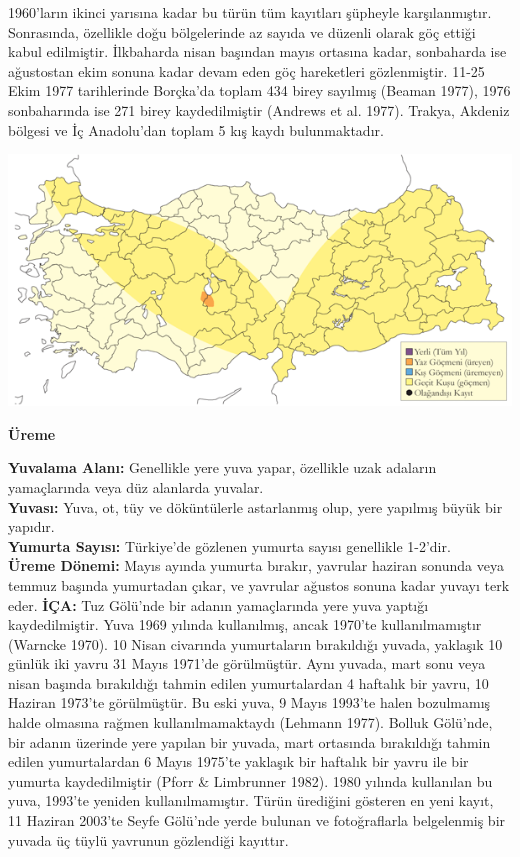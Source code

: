 \documentclass[
  letterpaper,
  DIV=11,
  numbers=noendperiod]{scrreprt}
\begin{document}
1960'ların ikinci yarısına kadar bu türün tüm kayıtları şüpheyle
karşılanmıştır. Sonrasında, özellikle doğu bölgelerinde az sayıda ve
düzenli olarak göç ettiği kabul edilmiştir. İlkbaharda nisan başından
mayıs ortasına kadar, sonbaharda ise ağustostan ekim sonuna kadar devam
eden göç hareketleri gözlenmiştir. 11-25 Ekim 1977 tarihlerinde
Borçka'da toplam 434 birey sayılmış (Beaman 1977), 1976 sonbaharında ise
271 birey kaydedilmiştir (Andrews et al. 1977). Trakya, Akdeniz bölgesi
ve İç Anadolu'dan toplam 5 kış kaydı bulunmaktadır.

\includegraphics{images/harita_Page_094.png}

\textbf{Üreme}

\textbf{Yuvalama Alanı:} Genellikle yere yuva yapar, özellikle uzak
adaların yamaçlarında veya düz alanlarda yuvalar.\\
\textbf{Yuvası:} Yuva, ot, tüy ve döküntülerle astarlanmış olup, yere
yapılmış büyük bir yapıdır.\\
\textbf{Yumurta Sayısı:} Türkiye'de gözlenen yumurta sayısı genellikle
1-2'dir.\\
\textbf{Üreme Dönemi:} Mayıs ayında yumurta bırakır, yavrular haziran
sonunda veya temmuz başında yumurtadan çıkar, ve yavrular ağustos sonuna
kadar yuvayı terk eder. \textbf{İÇA:} Tuz Gölü'nde bir adanın
yamaçlarında yere yuva yaptığı kaydedilmiştir. Yuva 1969 yılında
kullanılmış, ancak 1970'te kullanılmamıştır (Warncke 1970). 10 Nisan
civarında yumurtaların bırakıldığı yuvada, yaklaşık 10 günlük iki yavru
31 Mayıs 1971'de görülmüştür. Aynı yuvada, mart sonu veya nisan başında
bırakıldığı tahmin edilen yumurtalardan 4 haftalık bir yavru, 10 Haziran
1973'te görülmüştür. Bu eski yuva, 9 Mayıs 1993'te halen bozulmamış
halde olmasına rağmen kullanılmamaktaydı (Lehmann 1977). Bolluk
Gölü'nde, bir adanın üzerinde yere yapılan bir yuvada, mart ortasında
bırakıldığı tahmin edilen yumurtalardan 6 Mayıs 1975'te yaklaşık bir
haftalık bir yavru ile bir yumurta kaydedilmiştir (Pforr \& Limbrunner
1982). 1980 yılında kullanılan bu yuva, 1993'te yeniden
kullanılmamıştır. Türün ürediğini gösteren en yeni kayıt, 11 Haziran
2003'te Seyfe Gölü'nde yerde bulunan ve fotoğraflarla belgelenmiş bir
yuvada üç tüylü yavrunun gözlendiği kayıttır.
\end{document}
